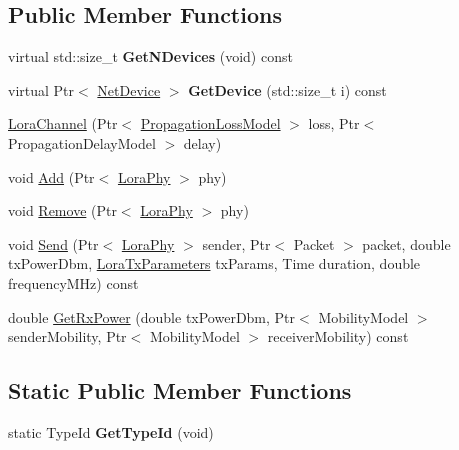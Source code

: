 \subsection*{Public Member Functions}
\begin{DoxyCompactItemize}
\item 
\mbox{\label{classns3_1_1lorawan_1_1LoraChannel_a3d20a873e0ba5c5949c51234e8182e1e}} 
virtual std\+::size\+\_\+t {\bfseries Get\+N\+Devices} (void) const
\item 
\mbox{\label{classns3_1_1lorawan_1_1LoraChannel_a13b1a66f3031a7c9f9cbccfa3ad9aa2a}} 
virtual Ptr$<$ \hyperlink{classNetDevice}{Net\+Device} $>$ {\bfseries Get\+Device} (std\+::size\+\_\+t i) const
\item 
\hyperlink{classns3_1_1lorawan_1_1LoraChannel_aba4c1b5203d4d8010e9e7485cc9e7721}{Lora\+Channel} (Ptr$<$ \hyperlink{classPropagationLossModel}{Propagation\+Loss\+Model} $>$ loss, Ptr$<$ Propagation\+Delay\+Model $>$ delay)
\item 
void \hyperlink{classns3_1_1lorawan_1_1LoraChannel_ac44d882080c3be8fb0f785c6ba29cae3}{Add} (Ptr$<$ \hyperlink{classns3_1_1lorawan_1_1LoraPhy}{Lora\+Phy} $>$ phy)
\item 
void \hyperlink{classns3_1_1lorawan_1_1LoraChannel_a6af92e0f9bdd6db2032983c052fd352a}{Remove} (Ptr$<$ \hyperlink{classns3_1_1lorawan_1_1LoraPhy}{Lora\+Phy} $>$ phy)
\item 
void \hyperlink{classns3_1_1lorawan_1_1LoraChannel_a87043ac31a597467def66e421a887954}{Send} (Ptr$<$ \hyperlink{classns3_1_1lorawan_1_1LoraPhy}{Lora\+Phy} $>$ sender, Ptr$<$ Packet $>$ packet, double tx\+Power\+Dbm, \hyperlink{structns3_1_1lorawan_1_1LoraTxParameters}{Lora\+Tx\+Parameters} tx\+Params, Time duration, double frequency\+M\+Hz) const
\item 
double \hyperlink{classns3_1_1lorawan_1_1LoraChannel_a8c975d8f8eecae5f75b35a1a409a58eb}{Get\+Rx\+Power} (double tx\+Power\+Dbm, Ptr$<$ Mobility\+Model $>$ sender\+Mobility, Ptr$<$ Mobility\+Model $>$ receiver\+Mobility) const
\end{DoxyCompactItemize}
\subsection*{Static Public Member Functions}
\begin{DoxyCompactItemize}
\item 
\mbox{\label{classns3_1_1lorawan_1_1LoraChannel_a270b7417e8c98610a68639bb4ad7980c}} 
static Type\+Id {\bfseries Get\+Type\+Id} (void)
\end{DoxyCompactItemize}


